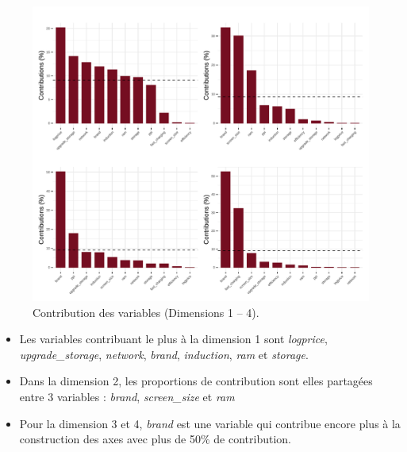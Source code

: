\documentclass[
  12pt,
]{report}
\begin{document}
\begin{figure}[H]

{\centering \includegraphics{report_files/figure-pdf/unnamed-chunk-13-1.pdf}

}

\caption{Contribution des variables (Dimensions 1 -- 4).}

\end{figure}%

\begin{itemize}
\item
  Les variables contribuant le plus à la dimension 1 sont
  \emph{logprice}, \emph{upgrade\_storage}, \emph{network},
  \emph{brand}, \emph{induction}, \emph{ram} et \emph{storage}.
\item
  Dans la dimension 2, les proportions de contribution sont elles
  partagées entre 3 variables : \emph{brand}, \emph{screen\_size} et
  \emph{ram}
\item
  Pour la dimension 3 et 4, \emph{brand} est une variable qui contribue
  encore plus à la construction des axes avec plus de 50\% de
  contribution.
\end{itemize}
\end{document}
